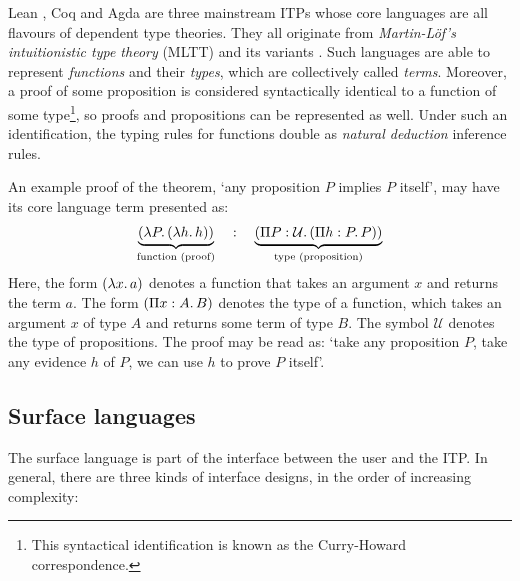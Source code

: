 \documentclass[twoside]{report}
\begin{document}
\begin{example}
    Lean \cite{moura2021lean}, Coq \cite{coq2024proof} and Agda \cite{norell2007towards} are three mainstream ITPs whose core languages are all flavours of dependent type theories. They all originate from \emph{Martin-Löf's intuitionistic type theory} (MLTT) \cite{martin1984intuitionistic} and its variants \cite{coquand1988calculus,luo1990extended}. Such languages are able to represent \emph{functions} and their \emph{types}, which are collectively called \emph{terms}. Moreover, a proof of some proposition is considered syntactically identical to a function of some type\footnote{This syntactical identification is known as the Curry-Howard correspondence.}, so proofs and propositions can be represented as well. Under such an identification, the typing rules for functions double as \emph{natural deduction} inference rules.

    An example proof of the theorem, `any proposition $P$ implies $P$ itself', may have its core language term presented as:
    $$\underbrace{(\lambda{P}.\,{(\lambda{h}.\,{h})})}_{\text{function (proof)}} \quad : \quad \underbrace{(\Pi{P} : {\mathcal U}.\,{(\Pi{h} : {P}.\,{P})})}_{\text{type (proposition)}}$$
    Here, the form $(\lambda{x}.\,{a})$ denotes a function that takes an argument $x$ and returns the term $a$. The form $(\Pi{x} : {A}.\,{B})$ denotes the type of a function, which takes an argument $x$ of type $A$ and returns some term of type $B$. The symbol $\mathcal U$ denotes the type of propositions. The proof may be read as: `take any proposition $P$, take any evidence $h$ of $P$, we can use $h$ to prove $P$ itself'.
\end{example}

\subsection*{Surface languages}

The surface language is part of the interface between the user and the ITP. In general, there are three kinds of interface designs, in the order of increasing complexity:
\end{document}
